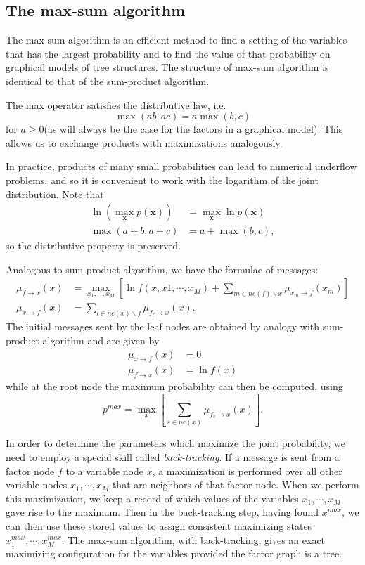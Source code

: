 \documentclass[a4paper]{report}
\renewcommand{\bf}{\mathbf}
\newcommand{\imp}[1]{{\color{blue}\textit{#1}}}
\begin{document}
\subsection{The max-sum algorithm}\label{MaxSum}
The max-sum algorithm is an efficient method to find a setting of the variables that has the largest probability and to find the value of that probability on graphical models of tree structures. The structure of max-sum algorithm is identical to that of the sum-product algorithm.

The max operator satisfies the distributive law, i.e.
\begin{equation}
	\max(ab,ac) = a \max(b,c)
\end{equation}
for $a\geq 0$(as will always be the case for the factors in a graphical model). This allows us to exchange products with maximizations analogously.

In practice, products of many small probabilities can lead to numerical underflow problems, and so it is convenient to work with the logarithm of the joint distribution. Note that
\begin{align}
	\ln(\max_{\bf{x}}p(\bf{x})) &= \max_{\bf{x}} \ln p(\bf{x})\\
	\max(a+b,a+c) &= a + \max(b,c),
\end{align}
so the distributive property is preserved.

Analogous to sum-product algorithm, we have the formulae of messages:
\begin{align}
	\mu_{f\rightarrow x}(x) &= \max_{x_1,\cdots,x_M}\left[\ln f(x,x1,\cdots,x_M)+\sum_{m \in ne(f)\backslash x} \mu_{x_m \rightarrow f}(x_m)\right]\\
	\mu_{x\rightarrow f}(x) &= \sum_{l \in ne(x)\backslash f}\mu_{f_l \rightarrow x}(x).
\end{align}
The initial messages sent by the leaf nodes are obtained by analogy with sum-product algorithm and are given by
\begin{align}
	\mu_{x \rightarrow f}(x) &= 0\\
	\mu_{f \rightarrow x}(x) &= \ln f(x)
\end{align}
while at the root node the maximum probability can then be computed, using
\begin{equation}
	p^{max} = \max_{x} \left[\sum_{s \in ne(x)}\mu_{f_s \rightarrow x}(x)\right].
\end{equation}

In order to determine the parameters which maximize the joint probability, we need to employ a special skill called \imp{back-tracking}. If a message is sent from a factor node $f$ to a variable node $x$, a maximization is performed over all other variable nodes $x_1,\cdots,x_M$ that are neighbors of that factor node. When we perform this maximization, we keep a record of which values of the variables $x_1,\cdots,x_M$ gave rise to the maximum. Then in the back-tracking step, having found $x^{max}$, we can then use these stored values to assign consistent maximizing states $x_1^{max},\cdots,x_M^{max}$. The max-sum algorithm, with back-tracking, gives an exact maximizing configuration for the variables provided the factor graph is a tree.
\end{document}
